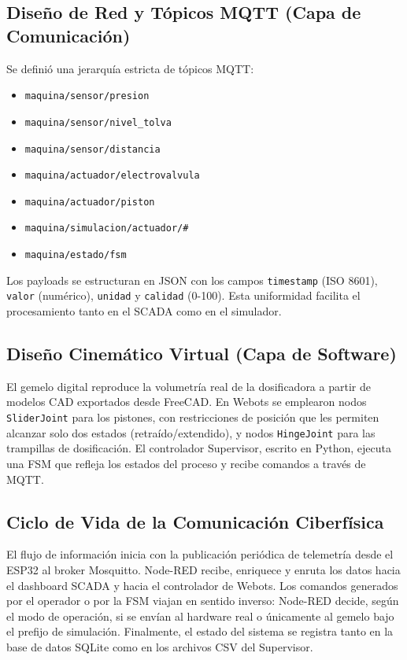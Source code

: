 \subsection{Diseño de Red y Tópicos MQTT (Capa de Comunicación)}

Se definió una jerarquía estricta de tópicos MQTT:
\begin{itemize}
    \item \texttt{maquina/sensor/presion}
    \item \texttt{maquina/sensor/nivel\_tolva}
    \item \texttt{maquina/sensor/distancia}
    \item \texttt{maquina/actuador/electrovalvula}
    \item \texttt{maquina/actuador/piston}
    \item \texttt{maquina/simulacion/actuador/\#}
    \item \texttt{maquina/estado/fsm}
\end{itemize}

Los payloads se estructuran en JSON con los campos \texttt{timestamp} (ISO 8601), \texttt{valor} (numérico), \texttt{unidad} y \texttt{calidad} (0-100). Esta uniformidad facilita el procesamiento tanto en el SCADA como en el simulador.

\subsection{Diseño Cinemático Virtual (Capa de Software)}

El gemelo digital reproduce la volumetría real de la dosificadora a partir de modelos CAD exportados desde FreeCAD. En Webots se emplearon nodos \texttt{SliderJoint} para los pistones, con restricciones de posición que les permiten alcanzar solo dos estados (retraído/extendido), y nodos \texttt{HingeJoint} para las trampillas de dosificación. El controlador Supervisor, escrito en Python, ejecuta una FSM que refleja los estados del proceso y recibe comandos a través de MQTT.

\subsection{Ciclo de Vida de la Comunicación Ciberfísica}

El flujo de información inicia con la publicación periódica de telemetría desde el ESP32 al broker Mosquitto. Node-RED recibe, enriquece y enruta los datos hacia el dashboard SCADA y hacia el controlador de Webots. Los comandos generados por el operador o por la FSM viajan en sentido inverso: Node-RED decide, según el modo de operación, si se envían al hardware real o únicamente al gemelo bajo el prefijo de simulación. Finalmente, el estado del sistema se registra tanto en la base de datos SQLite como en los archivos CSV del Supervisor.

